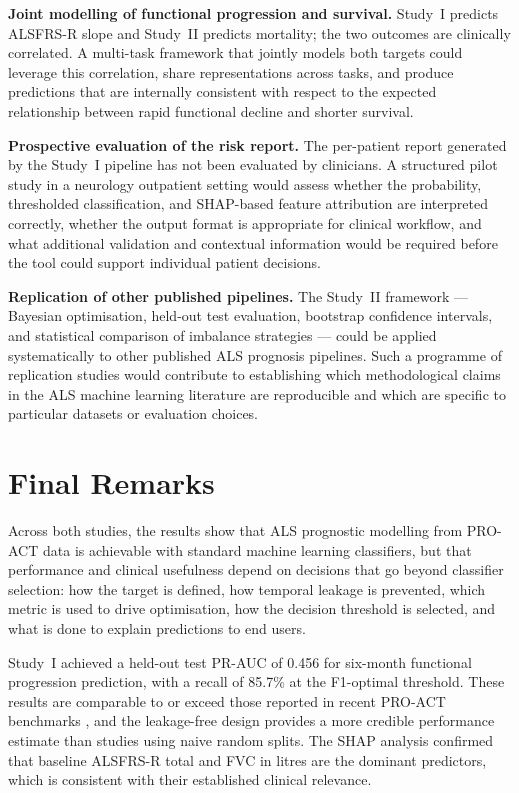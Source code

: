 \textbf{Joint modelling of functional progression and survival.} Study~I predicts \gls{ALSFRS-R} slope and Study~II predicts mortality; the two outcomes are clinically correlated. A multi-task framework that jointly models both targets could leverage this correlation, share representations across tasks, and produce predictions that are internally consistent with respect to the expected relationship between rapid functional decline and shorter survival.

\textbf{Prospective evaluation of the risk report.} The per-patient report generated by the Study~I pipeline has not been evaluated by clinicians. A structured pilot study in a neurology outpatient setting would assess whether the probability, thresholded classification, and \gls{SHAP}-based feature attribution are interpreted correctly, whether the output format is appropriate for clinical workflow, and what additional validation and contextual information would be required before the tool could support individual patient decisions.

\textbf{Replication of other published pipelines.} The Study~II framework --- Bayesian optimisation, held-out test evaluation, bootstrap confidence intervals, and statistical comparison of imbalance strategies --- could be applied systematically to other published ALS prognosis pipelines. Such a programme of replication studies would contribute to establishing which methodological claims in the ALS machine learning literature are reproducible and which are specific to particular datasets or evaluation choices.

\section{Final Remarks}
\label{sec:conclusion_final}

Across both studies, the results show that \gls{ALS} prognostic modelling from \gls{PRO-ACT} data is achievable with standard machine learning classifiers, but that performance and clinical usefulness depend on decisions that go beyond classifier selection: how the target is defined, how temporal leakage is prevented, which metric is used to drive optimisation, how the decision threshold is selected, and what is done to explain predictions to end users.

Study~I achieved a held-out test \gls{PR-AUC} of 0.456 for six-month functional progression prediction, with a recall of 85.7\% at the F1-optimal threshold. These results are comparable to or exceed those reported in recent \gls{PRO-ACT} benchmarks \cite{Grollemund2019, Pancotti2022}, and the leakage-free design provides a more credible performance estimate than studies using naive random splits. The \gls{SHAP} analysis confirmed that baseline \gls{ALSFRS-R} total and \gls{FVC} in litres are the dominant predictors, which is consistent with their established clinical relevance.

